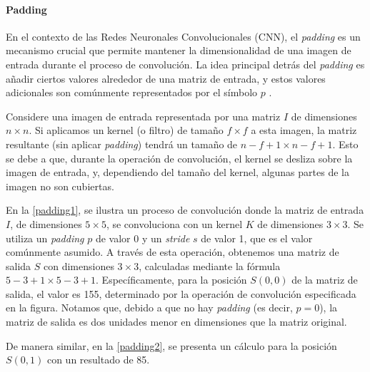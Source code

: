                 \paragraph{Padding}
                    En el contexto de las Redes Neuronales Convolucionales (CNN), el \textit{padding} es un mecanismo crucial que permite mantener la dimensionalidad de una imagen de entrada durante el proceso de convolución. La idea principal detrás del \textit{padding} es añadir ciertos valores alrededor de una matriz de entrada, y estos valores adicionales son comúnmente representados por el símbolo \( p \) \autocite{Goodfellow2016}.

                    Considere una imagen de entrada representada por una matriz \( I \) de dimensiones \( n \times n \). Si aplicamos un kernel (o filtro) de tamaño \( f \times f \) a esta imagen, la matriz resultante (sin aplicar \textit{padding}) tendrá un tamaño de \( n - f + 1 \times n - f + 1 \). Esto se debe a que, durante la operación de convolución, el kernel se desliza sobre la imagen de entrada, y, dependiendo del tamaño del kernel, algunas partes de la imagen no son cubiertas.
                    
                    En la \autoref{padding1}, se ilustra un proceso de convolución donde la matriz de entrada \( I \), de dimensiones \( 5 \times 5 \), se convoluciona con un kernel \( K \) de dimensiones \( 3 \times 3 \). Se utiliza un \textit{padding} \( p \) de valor 0 y un \textit{stride} \( s \) de valor 1, que es el valor comúnmente asumido. A través de esta operación, obtenemos una matriz de salida \( S \) con dimensiones \( 3 \times 3 \), calculadas mediante la fórmula \( 5 - 3 + 1 \times 5 - 3 + 1 \). Específicamente, para la posición \( S(0, 0) \) de la matriz de salida, el valor es 155, determinado por la operación de convolución especificada en la figura. Notamos que, debido a que no hay \textit{padding} (es decir, \( p = 0 \)), la matriz de salida es dos unidades menor en dimensiones que la matriz original.

                    De manera similar, en la \autoref{padding2}, se presenta un cálculo para la posición \( S(0, 1) \) con un resultado de 85.


